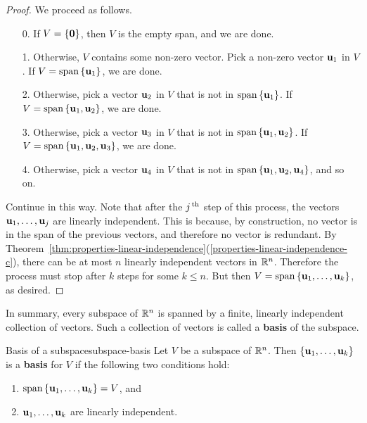 \begin{proof}
  We proceed as follows.
  \begin{enumerate}
  \item[0.] If $V=\set{\vect{0}}$, then $V$ is the empty span, and we
    are done.
  \item[1.] Otherwise, $V$ contains some non-zero vector.  Pick a
    non-zero vector $\vect{u}_{1}$ in $V$. If
    $V=\sspan\set{\vect{u}_{1}}$, we are done.
  \item[2.] Otherwise, pick a vector $\vect{u}_{2}$ in $V$ that is not
    in $\sspan\set{\vect{u}_{1}}$. If
    $V=\sspan\set{\vect{u}_{1},\vect{u}_{2}}$, we are done.
  \item[3.] Otherwise, pick a vector $\vect{u}_{3}$ in $V$ that is not
    in $\sspan\set{\vect{u}_{1},\vect{u}_{2}}$. If
    $V=\sspan\set{\vect{u}_{1},\vect{u}_{2},\vect{u}_{3}}$, we are done.
  \item[4.] Otherwise, pick a vector $\vect{u}_{4}$ in $V$ that is not
    in $\sspan\set{\vect{u}_{1},\vect{u}_{2},\vect{u}_{4}}$, and so on.
  \end{enumerate}
  Continue in this way. Note that after the $j^{\,\rm th}$ step of this
  process, the vectors $\vect{u}_1,\ldots,\vect{u}_j$ are linearly
  independent. This is because, by construction, no vector is in the
  span of the previous vectors, and therefore no vector is redundant.
  By
  Theorem~\ref{thm:properties-linear-independence}(\ref{properties-linear-independence-c}),
  there can be at most $n$ linearly independent vectors in $\mathbb{R}^n$.
  Therefore the process must stop after $k$ steps for some $k\leq
  n$. But then $V=\sspan\set{\vect{u}_{1},\ldots ,\vect{u}_{k}}$, as
  desired.
\end{proof}

In summary, every subspace of\/ $\mathbb{R}^n$ is spanned by a finite,
linearly independent collection of vectors.  Such a collection of
vectors is called a \textbf{basis} of the subspace.

\begin{definition}{Basis of a subspace}{subspace-basis}
  Let $V$ be a subspace of\/ $\mathbb{R}^n$. Then
  $\set{\vect{u}_{1},\ldots ,\vect{u}_{k}}$ is a \textbf{basis} for
  $V$ if the following two conditions hold:%
  \begin{enumerate}
  \item $\sspan\set{\vect{u}_{1},\ldots,\vect{u}_{k}}=V$, and
  \item $\vect{u}_{1},\ldots,\vect{u}_{k}$ are linearly independent.
  \end{enumerate}
\end{definition}

